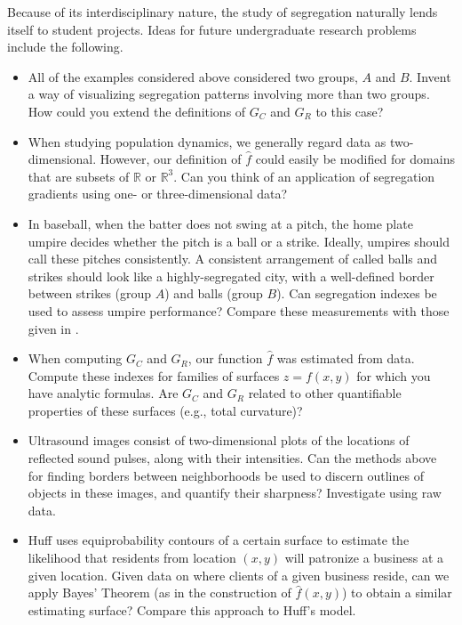 \documentclass{article}
\theoremstyle{theorem}
\theoremstyle{definition}
\begin{document}
Because of its interdisciplinary nature, the study of segregation naturally lends itself to student projects. Ideas for future undergraduate research problems include the following.

\begin{itemize}
  \item All of the examples considered above considered two groups, $A$ and $B$. Invent a way of visualizing segregation patterns involving more than two groups. How could you extend the definitions of $G_C$ and $G_R$ to this case?
  \item When studying population dynamics, we generally regard data as two-dimensional. However, our definition of $\hat{f}$ could easily be modified for domains that are subsets of $\mathbb{R}$ or $\mathbb{R}^3$.  Can you think of an application of segregation gradients using one- or three-dimensional data?
  \item In baseball, when the batter does not swing at a pitch, the home plate umpire decides whether the pitch is a ball or a strike. Ideally, umpires should call these pitches consistently. A consistent arrangement of called balls and strikes should look like a highly-segregated city, with a well-defined border between strikes (group $A$) and balls (group $B$). Can segregation indexes be used to assess umpire performance? Compare these measurements with those given in \cite{hunter18}.
  \item When computing $G_C$ and $G_R$, our function $\hat{f}$ was estimated from data. Compute these indexes for families of surfaces $z = f(x,y)$ for which you have analytic formulas. Are $G_C$ and $G_R$ related to other quantifiable properties of these surfaces (e.g., total curvature)?
  \item Ultrasound images consist of two-dimensional plots of the locations of reflected sound pulses, along with their intensities. Can the methods above for finding borders between neighborhoods be used to discern outlines of objects in these images, and quantify their sharpness? Investigate using raw data.
  \item Huff \cite{huff63} uses equiprobability contours of a certain surface to estimate the likelihood that residents from location $(x,y)$ will patronize a business at a given location. Given data on where clients of a given business reside, can we apply Bayes' Theorem (as in the construction of $\hat{f}(x,y)$) to obtain a similar estimating surface? Compare this approach to Huff's model.
\end{itemize}
\end{document}
